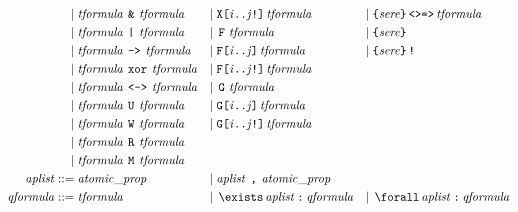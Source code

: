 \documentclass[a4paper,twoside,10pt,DIV=12]{scrreprt}
\DeclareMathOperator{\F}{\texttt{F}}
\newcommand{\FREP}[1]{\texttt{F[#1]}}
\newcommand{\StrongFREP}[1]{\texttt{F[#1!]}}
\DeclareMathOperator{\G}{\texttt{G}}
\newcommand{\GREP}[1]{\texttt{G[#1]}}
\newcommand{\StrongGREP}[1]{\texttt{G[#1!]}}
\newcommand{\U}{\mathbin{\texttt{U}}}
\newcommand{\R}{\mathbin{\texttt{R}}}
\newcommand{\StrongXREP}[1]{\texttt{X[#1!]}}
\newcommand{\M}{\mathbin{\texttt{M}}}
\newcommand{\W}{\mathbin{\texttt{W}}}
\DeclareMathOperator{\NOT}{\texttt{!}}
\newcommand{\XOR}{\mathbin{\texttt{xor}}}
\newcommand{\IMPLIES}{\mathbin{\texttt{->}}}
\newcommand{\EQUIV}{\mathbin{\texttt{<->}}}
\newcommand{\OR}{\mathbin{\texttt{|}}}
\newcommand{\AND}{\mathbin{\texttt{\&}}}
\newcommand{\COLON}{\mathbin{\texttt{:}}}
\newcommand{\COMMA}{\mathbin{\texttt{,}}}
\newcommand{\0}{\texttt{0}}
\newcommand{\1}{\texttt{1}}
\DeclareMathOperator{\EXISTS}{\texttt{\textbackslash{}exists}}
\DeclareMathOperator{\FORALL}{\texttt{\textbackslash{}forall}}
\newcommand{\EsuffixEQ}{\texttt{<>=>}}
\newcommand\mvar[1]{\ensuremath{\mathit{#1}}}
\newcommand\tsamp[1]{\text{\texttt{#1}}}
\newcommand\msamp[1]{#1}
\begin{document}
\begin{align*}
 \mid{}                     & \mathit{tformula}\,\msamp{\AND}\,\mathit{tformula}     & \mid{} & \msamp{\StrongXREP{\mvar{i}..\mvar{j}}}\,\mathit{tformula} & \mid{} & \tsamp{\{}\mathit{sere}\tsamp{\}}\,\msamp{\EsuffixEQ}\,\mathit{tformula} \\
 \mid{}                     & \mathit{tformula}\,\msamp{\OR}\,\mathit{tformula}      & \mid{} & \msamp{\F}\,\mathit{tformula}                              & \mid{} & \tsamp{\{}\mathit{sere}\tsamp{\}}                                        \\
 \mid{}                     & \mathit{tformula}\,\msamp{\IMPLIES}\,\mathit{tformula} & \mid{} & \msamp{\FREP{\mvar{i}..\mvar{j}}}\,\mathit{tformula}       & \mid{} & \tsamp{\{}\mathit{sere}\tsamp{\}}\msamp{\NOT}                            \\
 \mid{}                     & \mathit{tformula}\,\msamp{\XOR}\,\mathit{tformula}     & \mid{} & \msamp{\StrongFREP{\mvar{i}..\mvar{j}}}\,\mathit{tformula}                                                                                     \\
 \mid{}                     & \mathit{tformula}\,\msamp{\EQUIV}\,\mathit{tformula}   & \mid{} & \msamp{\G}\,\mathit{tformula}                                                                                                                  \\
 \mid{}                     & \mathit{tformula}\,\msamp{\U}\,\mathit{tformula}       & \mid{} & \msamp{\GREP{\mvar{i}..\mvar{j}}}\,\mathit{tformula}                                                                                           \\
 \mid{}                     & \mathit{tformula}\,\msamp{\W}\,\mathit{tformula}       & \mid{} & \msamp{\StrongGREP{\mvar{i}..\mvar{j}}}\,\mathit{tformula}                                                                                     \\
 \mid{}                     & \mathit{tformula}\,\msamp{\R}\,\mathit{tformula}                                                                                                                                                                 \\
  \mid{}                    & \mathit{tformula}\,\msamp{\M}\,\mathit{tformula}
  \\
 \mathit{aplist}   ::={}    & \mathit{atomic\_prop} & \mid{} & \mathit{aplist}\,\COMMA\,\mathit{atomic\_prop}
  \\
 \mathit{qformula} ::={}    & \mathit{tformula}                                      & \mid{} & \EXISTS \mathit{aplist} \COLON \mathit{qformula} & \mid{} & \FORALL \mathit{aplist} \COLON \mathit{qformula}
\end{align*}
\end{document}
